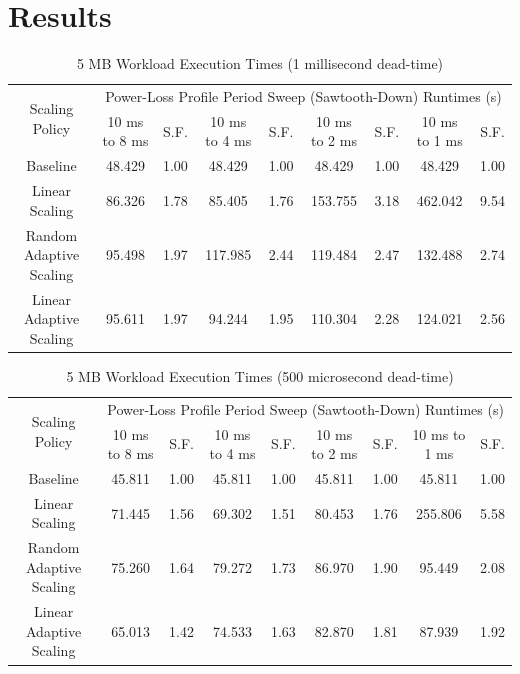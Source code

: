 \documentclass[journal, twoside]{IEEEtran}
\begin{document}
\lipsum[2]

\section{Results}

\lipsum[4]

\begin{table}
    \renewcommand{\arraystretch}{1.3} %
    \caption{5 MB Workload Execution Times (1 millisecond dead-time)}
    \label{main-workload-results-1ms}
    \centering
    \begin{tabular}{c||c|c|c|c|c|c|c|c}
        \hline
        \multirow{2}{*}{Scaling Policy} & \multicolumn{8}{c}{Power-Loss Profile Period Sweep (Sawtooth-Down) Runtimes (s)} \\\cline{2-9}
        {} & {10 ms to 8 ms} & {S.F.} & {10 ms to 4 ms} & {S.F.} & {10 ms to 2 ms} & {S.F.} & {10 ms to 1 ms} & {S.F.} \\
        \hline
        \hline
        {Baseline}                  & {48.429} & {1.00} & {48.429}  & {1.00} & {48.429}  & {1.00} & {48.429}  & {1.00}\\
        {Linear Scaling}            & {86.326} & {1.78} & {85.405}  & {1.76} & {153.755} & {3.18} & {462.042} & {9.54}\\
        {Random Adaptive Scaling}   & {95.498} & {1.97} & {117.985} & {2.44} & {119.484} & {2.47} & {132.488} & {2.74}\\
        {Linear Adaptive Scaling}   & {95.611} & {1.97} & {94.244}  & {1.95} & {110.304} & {2.28} & {124.021} & {2.56}\\
        \hline
    \end{tabular}
\end{table}

\begin{table}
    \renewcommand{\arraystretch}{1.3} %
    \caption{5 MB Workload Execution Times (500 microsecond dead-time)}
    \label{main-workload-results-500us}
    \centering
    \begin{tabular}{c||c|c|c|c|c|c|c|c}
        \hline
        \multirow{2}{*}{Scaling Policy} & \multicolumn{8}{c}{Power-Loss Profile Period Sweep (Sawtooth-Down) Runtimes (s)} \\\cline{2-9}
        {} & {10 ms to 8 ms} & {S.F.} & {10 ms to 4 ms} & {S.F.} & {10 ms to 2 ms} & {S.F.} & {10 ms to 1 ms} & {S.F.} \\
        \hline
        \hline
        {Baseline}                  & {45.811} & {1.00} & {45.811}  & {1.00} & {45.811} & {1.00}  & {45.811}  & {1.00}\\
        {Linear Scaling}            & {71.445} & {1.56} & {69.302}  & {1.51} & {80.453} & {1.76}  & {255.806} & {5.58}\\
        {Random Adaptive Scaling}   & {75.260} & {1.64} & {79.272}  & {1.73} & {86.970} & {1.90}  & {95.449}  & {2.08}\\
        {Linear Adaptive Scaling}   & {65.013} & {1.42} & {74.533}  & {1.63} & {82.870} & {1.81}  & {87.939}  & {1.92}\\
        \hline
    \end{tabular}
\end{table}
\end{document}
